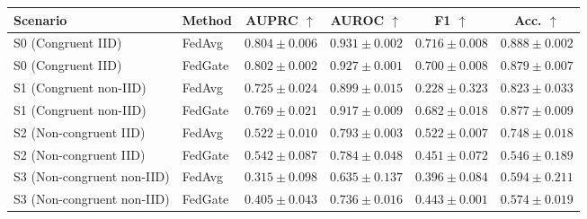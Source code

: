 \begin{tabular}{llcccc}
\toprule
Scenario & Method & AUPRC $\uparrow$ & AUROC $\uparrow$ & F1 $\uparrow$ & Acc. $\uparrow$ \\
\midrule
S0 (Congruent IID) & FedAvg & \textbf{$0.804 \pm 0.006$} & $0.931 \pm 0.002$ & $0.716 \pm 0.008$ & $0.888 \pm 0.002$ \\
S0 (Congruent IID) & FedGate & $0.802 \pm 0.002$ & $0.927 \pm 0.001$ & $0.700 \pm 0.008$ & $0.879 \pm 0.007$ \\
\midrule
S1 (Congruent non-IID) & FedAvg & $0.725 \pm 0.024$ & $0.899 \pm 0.015$ & $0.228 \pm 0.323$ & $0.823 \pm 0.033$ \\
S1 (Congruent non-IID) & FedGate & \textbf{$0.769 \pm 0.021$} & $0.917 \pm 0.009$ & $0.682 \pm 0.018$ & $0.877 \pm 0.009$ \\
\midrule
S2 (Non-congruent IID) & FedAvg & $0.522 \pm 0.010$ & $0.793 \pm 0.003$ & $0.522 \pm 0.007$ & $0.748 \pm 0.018$ \\
S2 (Non-congruent IID) & FedGate & \textbf{$0.542 \pm 0.087$} & $0.784 \pm 0.048$ & $0.451 \pm 0.072$ & $0.546 \pm 0.189$ \\
\midrule
S3 (Non-congruent non-IID) & FedAvg & $0.315 \pm 0.098$ & $0.635 \pm 0.137$ & $0.396 \pm 0.084$ & $0.594 \pm 0.211$ \\
S3 (Non-congruent non-IID) & FedGate & \textbf{$0.405 \pm 0.043$} & $0.736 \pm 0.016$ & $0.443 \pm 0.001$ & $0.574 \pm 0.019$ \\
\bottomrule
\end{tabular}
